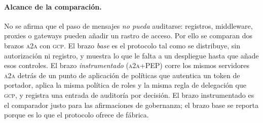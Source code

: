 \documentclass[conference,letterpaper]{IEEEtran}
\newcommand{\gcp}{\textsc{gcp}}
\newcommand{\ata}{\textsc{a2a}}
\begin{document}
\paragraph{Alcance de la comparación.} No se afirma que el paso de mensajes \emph{no pueda}
auditarse: registros, middleware, proxies o gateways pueden añadir un rastro de acceso. Por ello se
comparan dos brazos \ata{} con \gcp{}. El brazo \emph{base} es el protocolo tal como se distribuye, sin
autorización ni registro, y muestra lo que le falta a un despliegue hasta que añade esos controles. El
brazo \emph{instrumentado} (\ata{}+PEP) corre los mismos servidores \ata{} detrás de un punto de
aplicación de políticas que autentica un token de portador, aplica la misma política de roles y la
misma regla de delegación que \gcp{}, y registra una entrada de auditoría por decisión. El brazo
instrumentado es el comparador justo para las afirmaciones de gobernanza; el brazo base se reporta
porque es lo que el protocolo ofrece de fábrica.
\end{document}
